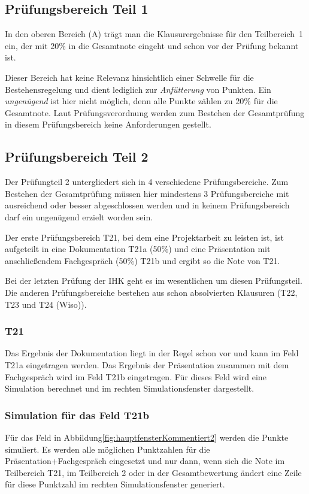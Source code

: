 \documentclass[a4paper,notitlepage,parskip=half]{scrartcl}
\newcommand*\circled[1]{\tikz[baseline=(char.base)]{
            \node[shape=circle,draw,inner sep=2pt] (char) {#1};}}
\begin{document}
\subsection{Prüfungsbereich Teil 1}
In den oberen Bereich (A) trägt man die Klausurergebnisse für den Teilbereich~1 ein, der mit 20\% in die Gesamtnote eingeht und schon vor der Prüfung bekannt ist.

Dieser Bereich hat keine Relevanz hinsichtlich einer Schwelle für die Bestehensregelung und dient lediglich zur \emph{Anfütterung} von Punkten. Ein \emph{ungenügend} ist hier nicht möglich, denn alle Punkte zählen zu 20\% für die Gesamtnote. Laut Prüfungsverordnung werden zum Bestehen der Gesamtprüfung in diesem Prüfungsbereich keine Anforderungen gestellt.

\subsection{Prüfungsbereich Teil 2}
Der Prüfungteil 2 untergliedert sich in 4 verschiedene Prüfungsbereiche. Zum Bestehen der Gesamtprüfung müssen hier mindestens 3 Prüfungsbereiche mit ausreichend oder besser abgeschlossen werden und in keinem Prüfungsbereich darf ein ungenügend erzielt worden sein.

Der erste Prüfungsbereich T21, bei dem eine Projektarbeit zu leisten ist, ist aufgeteilt in eine Dokumentation T21a (50\%) und eine Präsentation mit anschließendem Fachgespräch (50\%) T21b und ergibt so die Note von T21.

Bei der letzten Prüfung der IHK geht es im wesentlichen um diesen Prüfungsteil. Die anderen Prüfungsbereiche bestehen aus schon absolvierten Klausuren (T22, T23 und T24 (Wiso)). 

\subsubsection*{T21}
Das Ergebnis der Dokumentation liegt in der Regel schon vor und kann im Feld T21a eingetragen werden.
Das Ergebnis der Präsentation zusammen mit dem Fachgespräch wird im Feld T21b eingetragen.
Für dieses Feld wird eine Simulation berechnet und im rechten Simulationsfenster dargestellt.

\subsubsection*{Simulation für das Feld T21b}
Für das Feld \circled{1} in Abbildung\ref{fig:hauptfensterKommentiert2} werden die Punkte simuliert.
Es werden alle möglichen Punktzahlen für die Präsentation+Fachgespräch eingesetzt und nur dann, wenn sich die Note im Teilbereich T21, im Teilbereich 2 oder in der Gesamtbewertung ändert eine Zeile für diese Punktzahl im rechten Simulationsfenster generiert. 
\end{document}
